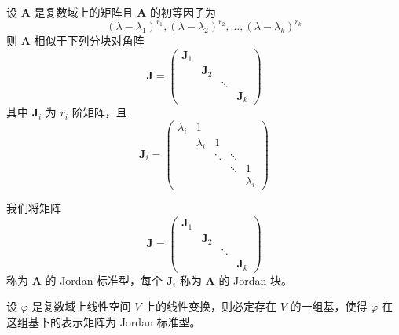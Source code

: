 \begin{theorem}
    设 $\bm{A}$ 是复数域上的矩阵且 $\bm{A}$ 的初等因子为
    \[
        (\lambda - \lambda_1)^{r_1}, (\lambda - \lambda_2)^{r_2}, \ldots, (\lambda - \lambda_k)^{r_k}
    \]
    则 $\bm{A}$ 相似于下列分块对角阵
    \begin{equation}
        \bm{J} = \begin{pmatrix}
            \bm{J}_1 & \        & \      & \        \\
            \        & \bm{J}_2 & \      & \        \\
            \        & \        & \ddots & \        \\
            \        & \        & \      & \bm{J}_k
        \end{pmatrix}
    \end{equation}
    其中 $\bm{J}_i$ 为 $r_i$ 阶矩阵，且
    \begin{equation}
        \bm{J}_i = \begin{pmatrix}
            \lambda_i & 1         & \      & \      & \         \\
            \         & \lambda_i & 1      & \      & \         \\
            \         & \         & \ddots & \ddots & \         \\
            \         & \         & \      & \ddots & 1         \\
            \         & \         & \      & \      & \lambda_i
        \end{pmatrix}
    \end{equation}
\end{theorem}

\begin{definition}
    我们将矩阵
    \[
        \bm{J} = \begin{pmatrix}
            \bm{J}_1 & \        & \      & \        \\
            \        & \bm{J}_2 & \      & \        \\
            \        & \        & \ddots & \        \\
            \        & \        & \      & \bm{J}_k
        \end{pmatrix}
    \]
    称为 $\bm{A}$ 的 Jordan 标准型，每个 $\bm{J}_i$ 称为 $\bm{A}$ 的 Jordan 块。
\end{definition}

\begin{theorem}
    设 $\varphi$ 是复数域上线性空间 $V$ 上的线性变换，则必定存在 $V$ 的一组基，使得 $\varphi$ 在这组基下的表示矩阵为 Jordan 标准型。
\end{theorem}

